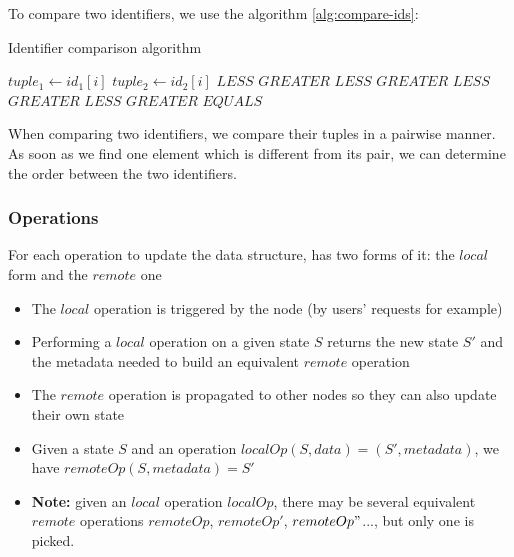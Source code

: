 \documentclass[a4paper]{article}
\begin{document}
To compare two identifiers, we use the algorithm \ref{alg:compare-ids}:

\begin{algorithm}
  \caption{Identifier comparison algorithm}\label{alg:compare-ids}
  \begin{algorithmic}
        \State $tuple_1 \gets id_1[i]$
        \State $tuple_2 \gets id_2[i]$
          \State \Return $LESS$
          \State \Return $GREATER$
          \State \Return $LESS$
          \State \Return $GREATER$
          \State \Return $LESS$
          \State \Return $GREATER$
        \EndIf
      \EndFor
        \State \Return $LESS$
        \State \Return $GREATER$
      \EndIf
      \State \Return $EQUALS$
    \EndFunction
  \end{algorithmic}
\end{algorithm}

When comparing two identifiers, we compare their tuples in a pairwise manner.
As soon as we find one element which is different from its pair,
we can determine the order between the two identifiers.

\subsubsection{Operations}

For each operation to update the data structure, has two forms of it: the $local$ form and the $remote$ one
\begin{itemize}
  \item The $local$ operation is triggered by the node (by users' requests for example)
  \item Performing a $local$ operation on a given state $S$
    returns the new state $S'$ and the metadata needed to build an equivalent $remote$ operation
  \item The $remote$ operation is propagated to other nodes so they can also update their own state
  \item Given a state $S$ and an operation $localOp(S, data) = (S', metadata)$,
    we have $remoteOp(S, metadata) = S'$
  \item \textbf{Note: } given an $local$ operation $localOp$,
    there may be several equivalent $remote$ operations $remoteOp$, $remoteOp'$, $remoteOp"$...,
    but only one is picked.
\end{itemize}
\end{document}
